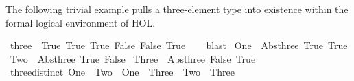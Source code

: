 \begin{isabellebody}
\begin{isamarkuptext}
  \medskip The following trivial example pulls a three-element type
  into existence within the formal logical environment of HOL.%
\end{isamarkuptext}%
\isamarkuptrue%
\isamarkupfalse%
\ three\ {}\ {}{}{}True{}\ True{}{}\ {}True{}\ False{}{}\ {}False{}\ True{}{}{}\isanewline
%
\isadelimproof
\ \ %
\endisadelimproof
%
\isatagproof
{}\isamarkupfalse%
\ blast%
\endisatagproof
{\isafoldproof}%
%
\isadelimproof
\isanewline
%
\endisadelimproof
\isanewline
{}\isamarkupfalse%
\ {}One\ {}\ Abs{}three\ {}True{}\ True{}{}\isanewline
{}\isamarkupfalse%
\ {}Two\ {}\ Abs{}three\ {}True{}\ False{}{}\isanewline
{}\isamarkupfalse%
\ {}Three\ {}\ Abs{}three\ {}False{}\ True{}{}\isanewline
\isanewline
{}\isamarkupfalse%
\ three{}distinct{}\ {}One\ {}\ Two{}\ \ {}One\ {}\ Three{}\ \ {}Two\ {}\ Three{}\isanewline

\end{isabellebody}
